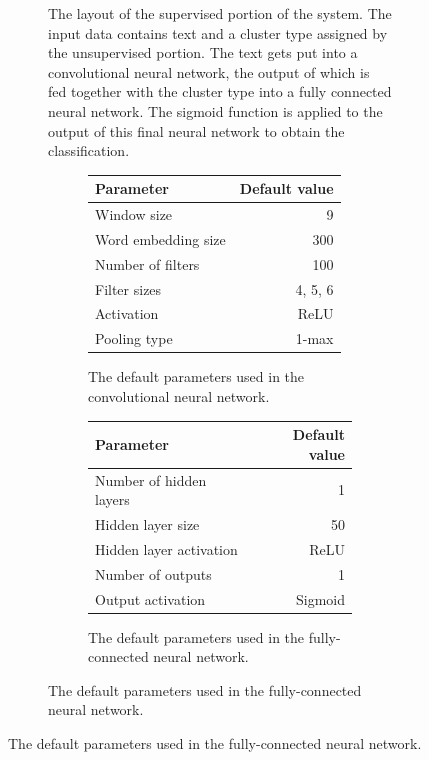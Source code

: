 \begin{figure}[p]
\begin{subfigure}[b]{0.45\textwidth}
    \caption{The layout of the supervised portion of the system. The input data
      contains text and a cluster type assigned by the unsupervised portion. The
      text gets put into a convolutional neural network, the output of which is
      fed together with the cluster type into a fully connected neural network.
      The sigmoid function is applied to the output of this final neural network
    to obtain the classification.\label{fig:nn_layout}}
  \end{subfigure}
  \hspace{0.05\textwidth}
  \begin{subfigure}[b]{0.45\textwidth}
    \begin{subfigure}[b]{\textwidth}
      \centering
      \begin{tabular}{lr}
	\toprule
	Parameter & Default value \\
	\midrule
	Window size & 9 \\
	Word embedding size & 300 \\
	Number of filters & 100 \\
	Filter sizes & 4, 5, 6 \\
	Activation & ReLU \\
	Pooling type & 1-max \\
	\bottomrule
      \end{tabular}
      \caption{The default parameters used in the convolutional neural network.}
      \vspace{1cm}
    \end{subfigure}

    \begin{subfigure}[b]{\textwidth}
      \centering
      \begin{tabular}{lr}
	\toprule
	Parameter & Default value \\
	\midrule
	Number of hidden layers & 1 \\
	Hidden layer size & 50 \\
	Hidden layer activation & ReLU \\
	Number of outputs & 1 \\
	Output activation & Sigmoid \\
	\bottomrule
      \end{tabular}
      \caption{The default parameters used in the fully-connected neural network.}
      \vspace{1cm}
    \end{subfigure}


\end{subfigure}
\end{figure}
